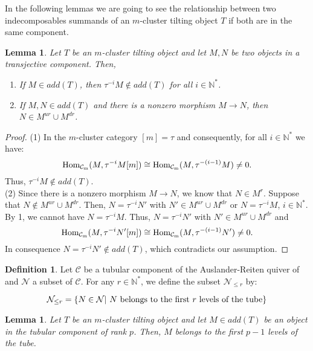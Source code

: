 \documentclass{amsart}
\theoremstyle{plain}
\newtheorem{lema}[teo]{Lemma}
\theoremstyle{definition}
\newtheorem{defi}[teo]{Definition}
\begin{document}
In the following lemmas we are going to see the relationship between two indecomposables summands  of an  $m$-cluster tilting object  $T$ if both are in the same component.\\

\begin{lema}\label{componente transyectiva}
Let $T$ be  an  $m$-cluster tilting object and let  $M,N$ be two  objects in a transjective component. Then,

\begin{enumerate}
  \item If $M\in add(T)$, then $\tau^{-i}M \notin add(T)$ for all $i\in \mathbb{N}^*$.
  \item If $M,N\in add(T)$ and there is a nonzero morphism $M\rightarrow N$, then $N\in M^{ur} \cup M^{dr}$.
\end{enumerate}
\end{lema}

\begin{proof}
(1) In the  $m$-cluster category $[m]=\tau$ and consequently, for all
 $i\in \mathbb{N}^*$ we have: $${\mathop{\rm Hom_{\mathcal{C}_m}}\nolimits}(M,\tau^{-i}M[m])\cong {\mathop{\rm Hom_{\mathcal{C}_m}}\nolimits}(M,\tau^{-(i-1)}M)\neq 0.$$
Thus,  $\tau^{-i}M\notin add(T)$.\\
(2) Since there is a nonzero  morphism $M\rightarrow N$, we know that
 $N\in M^r$. Suppose that $N\notin M^{ur}\cup M^{dr}$. Then, $N=\tau^{-i}N'$ with
  $N'\in M^{ur}\cup M^{dr}$ or $N=\tau^{-i}M$, $i\in \mathbb{N}^*$. By 1,  we cannot have $N=\tau^{-i}M$. Thus, $N=\tau^{-i}N'$ with $N'\in M^{ur}\cup M^{dr}$ and
$${\mathop{\rm Hom_{\mathcal{C}_m}}\nolimits}(M,\tau^{-i}N'[m])\cong {\mathop{\rm Hom_{\mathcal{C}_m}}\nolimits}(M,\tau^{-(i-1)}N')\neq 0.$$
In consequence  $N=\tau^{-i}N'\notin add(T)$, which contradicts our assumption.
\end{proof}

\begin{defi}
Let   $\mathcal{C}$  be a  tubular component of the  Auslander-Reiten quiver of  ${\mathop{\mathcal{C}_m}\nolimits}$ and   $\mathcal{N}$ a subset of  $\mathcal{C}$. For any $r\in \mathbb{N}^*$, we define the  subset $\mathcal{N}_{\leq  r}$ by:

$$\mathcal{N}_{\leq  r}=\{N\in \mathcal{N} | \textnormal{  $N$  belongs to the first $r$ levels of the tube} \}$$

\end{defi}

\begin{lema}
Let $T$ be an  $m$-cluster tilting object  and let  $M\in add(T)$ be an object in the tubular component of rank $p$.  Then,  $M$ belongs to the first  $p-1$  levels of the tube.
\end{lema}
\end{document}
